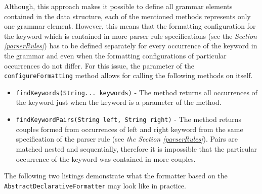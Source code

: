 \documentclass[12pt,notitlepage,a4paper]{report}
\begin{document}
Although, this approach makes it possible to define all grammar elements contained in the data structure, each of the mentioned methods represents only one grammar element. However, this means that the formatting configuration for the keyword which is contained in more parser rule specifications (see the \textit{Section \ref{parserRules}}) has to be defined separately for every occurrence of the keyword in the grammar and even when the formatting configurations of particular occurrences do not differ. For this issue, the parameter of the \texttt{configureFormatting} method allows for calling the following methods on itself.
\begin{itemize}
\item \texttt{findKeywords(String... keywords)} - The method returns all occurrences of the keyword just when the keyword is a parameter of the method.
\item \texttt{findKeywordPairs(String left, String right)} - The method returns couples formed from occurrences of left and right keyword from the same specification of the parser rule (see \textit{the Section \ref{parserRules}}). Pairs are matched nested and sequentially, therefore it is impossible that the particular occurrence of the keyword was contained in more couples.
\end{itemize}

The following two listings demonstrate what the formatter based on the \texttt{AbstractDeclarativeFormatter} may look like in practice.
\end{document}
